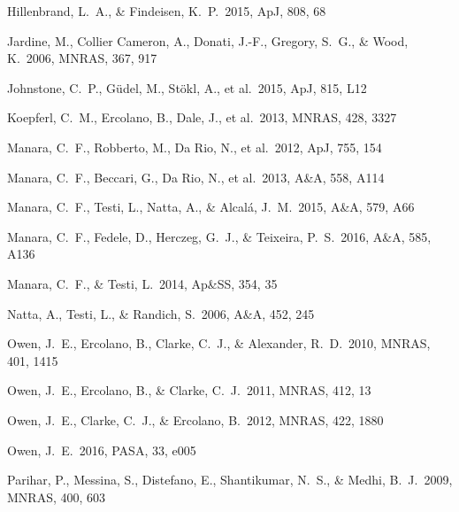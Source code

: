 \documentclass[10pt,fleqn,twoside]{article}
\newcommand*\aap{A\&A}
\newcommand*\apj{ApJ}
\newcommand*\apjl{ApJ}
\newcommand*\apss{Ap\&SS}
\newcommand*\mnras{MNRAS}
\newcommand*\pasa{PASA}
\begin{document}
\begin{thebibliography}{}
 Hillenbrand, L.~A., \& Findeisen, K.~P.\ 2015, \apj, 808, 68 

 Jardine, M., Collier Cameron, A., Donati, J.-F., Gregory, S.~G., \& Wood, K.\ 2006, \mnras, 367, 917

 Johnstone, C.~P., G{\"u}del, M., St{\"o}kl, A., et al.\ 2015, \apjl, 815, L12

 Koepferl, C.~M., Ercolano, B., Dale, J., et al.\ 2013, \mnras, 428, 3327

 Manara, C.~F., Robberto, M., Da Rio, N., et al.\ 2012, \apj, 755, 154

 Manara, C.~F., Beccari, G., Da Rio, N., et al.\ 2013, \aap, 558, A114 

 Manara, C.~F., Testi, L., Natta, A., \& Alcal{\'a}, J.~M.\ 2015, \aap, 579, A66

 Manara, C.~F., Fedele, D., Herczeg, G.~J., \& Teixeira, P.~S.\ 2016, \aap, 585, A136 


 Manara, C.~F., \& Testi, L.\ 2014, \apss, 354, 35 

 Natta, A., Testi, L., \& Randich, S.\ 2006, \aap, 452, 245


 Owen, J.~E., Ercolano, B., Clarke, C.~J., \& Alexander, R.~D.\ 2010, \mnras, 401, 1415

 Owen, J.~E., Ercolano, B., \& Clarke, C.~J.\ 2011, \mnras, 412, 13

 Owen, J.~E., Clarke, C.~J., \& Ercolano, B.\ 2012, \mnras, 422, 1880 

 Owen, J.~E.\ 2016, \pasa, 33, e005 

 Parihar, P., Messina, S., Distefano, E., Shantikumar, N.~S., \& Medhi, B.~J.\ 2009, \mnras, 400, 603 


\end{thebibliography}
\end{document}
